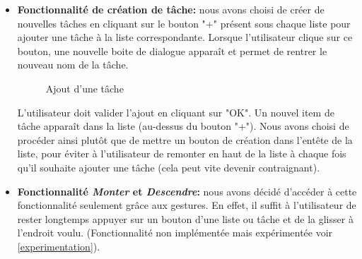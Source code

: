 \documentclass[a4paper,10pt]{article}
\begin{document}
\begin{itemize}
\item \textbf{Fonctionnalité de création de tâche:} nous avons choisi de créer de nouvelles tâches en cliquant sur le bouton "+" présent sous chaque liste pour ajouter une tâche à la liste correspondante. Lorsque l'utilisateur clique sur ce bouton, une nouvelle boite de dialogue apparaît et permet de rentrer le nouveau nom de la tâche.
\begin{figure}[H]
    \center
    \quad
    \caption{Ajout d'une tâche}
\end{figure}
L'utilisateur doit valider l'ajout en cliquant sur "OK". Un nouvel item de tâche apparaît dans la liste (au-dessus du bouton "+"). Nous avons choisi de procéder ainsi plutôt que de mettre un bouton de création dans l'entête de la liste, pour éviter à l'utilisateur de remonter en haut de la liste à chaque fois qu'il souhaite ajouter une tâche (cela peut vite devenir contraignant).
\item \textbf{Fonctionnalité \textit{Monter} et \textit{Descendre}:} nous avons décidé d'accéder à cette fonctionnalité seulement grâce aux gestures. En effet, il suffit à l'utilisateur de rester longtemps appuyer sur un bouton d'une liste ou tâche et de la glisser à l'endroit voulu. (Fonctionnalité non implémentée mais expérimentée voir \ref{experimentation}).

\end{itemize}
\end{document}
